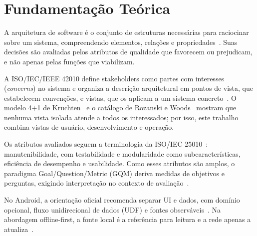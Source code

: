 \section{Fundamentação Teórica}\label{sec:fundamentacao}
A arquitetura de software é o conjunto de estruturas necessárias para
raciocinar sobre um sistema, compreendendo elementos, relações e
propriedades~\cite{bass2021}. Suas decisões são avaliadas pelos atributos de
qualidade que favorecem ou prejudicam, e não apenas pelas funções que
viabilizam.

A ISO/IEC/IEEE 42010 define stakeholders como partes com interesses
(\emph{concerns}) no sistema e organiza a descrição arquitetural em pontos
de vista, que estabelecem convenções, e vistas, que os aplicam a um sistema
concreto~\cite{iso42010}. O modelo 4+1 de Kruchten~\cite{kruchten1995} e o
catálogo de Rozanski e Woods~\cite{rozanski2011} mostram que nenhuma vista
isolada atende a todos os interessados; por isso, este trabalho combina
vistas de usuário, desenvolvimento e operação.

Os atributos avaliados seguem a terminologia da ISO/IEC 25010~\cite{iso25010}:
manutenibilidade, com testabilidade e modularidade como subcaracterísticas,
eficiência de desempenho e usabilidade. Como esses atributos são amplos, o
paradigma Goal/Question/Metric (GQM) deriva medidas de objetivos e perguntas,
exigindo interpretação no contexto de avaliação~\cite{basili1994}.

No Android, a orientação oficial recomenda separar UI e dados, com domínio
opcional, fluxo unidirecional de dados (UDF) e fontes observáveis~\cite{android-arquitetura,android-dominio}.
Na abordagem offline-first, a fonte local é a referência para leitura e a
rede apenas a atualiza~\cite{android-offline}.
